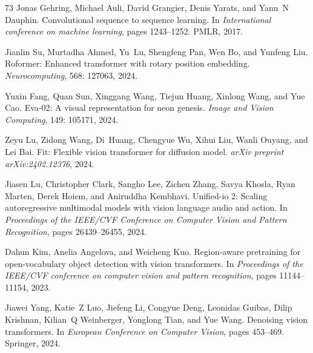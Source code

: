 \documentclass{article}
\begin{document}
\begin{thebibliography}{73}
Jonas Gehring, Michael Auli, David Grangier, Denis Yarats, and Yann~N Dauphin.
\newblock Convolutional sequence to sequence learning.
\newblock In \emph{International conference on machine learning}, pages
  1243--1252. PMLR, 2017.

Jianlin Su, Murtadha Ahmed, Yu~Lu, Shengfeng Pan, Wen Bo, and Yunfeng Liu.
\newblock Roformer: Enhanced transformer with rotary position embedding.
\newblock \emph{Neurocomputing}, 568: 127063, 2024.

Yuxin Fang, Quan Sun, Xinggang Wang, Tiejun Huang, Xinlong Wang, and Yue Cao.
\newblock Eva-02: A visual representation for neon genesis.
\newblock \emph{Image and Vision Computing}, 149: 105171, 2024.

Zeyu Lu, Zidong Wang, Di~Huang, Chengyue Wu, Xihui Liu, Wanli Ouyang, and Lei
  Bai.
\newblock Fit: Flexible vision transformer for diffusion model.
\newblock \emph{arXiv preprint arXiv:2402.12376}, 2024{}.

Jiasen Lu, Christopher Clark, Sangho Lee, Zichen Zhang, Savya Khosla, Ryan
  Marten, Derek Hoiem, and Aniruddha Kembhavi.
\newblock Unified-io 2: Scaling autoregressive multimodal models with vision
  language audio and action.
\newblock In \emph{Proceedings of the IEEE/CVF Conference on Computer Vision
  and Pattern Recognition}, pages 26439--26455, 2024{}.

Dahun Kim, Anelia Angelova, and Weicheng Kuo.
\newblock Region-aware pretraining for open-vocabulary object detection with
  vision transformers.
\newblock In \emph{Proceedings of the IEEE/CVF conference on computer vision
  and pattern recognition}, pages 11144--11154, 2023.

Jiawei Yang, Katie~Z Luo, Jiefeng Li, Congyue Deng, Leonidas Guibas, Dilip
  Krishnan, Kilian~Q Weinberger, Yonglong Tian, and Yue Wang.
\newblock Denoising vision transformers.
\newblock In \emph{European Conference on Computer Vision}, pages 453--469.
  Springer, 2024.


\end{thebibliography}
\end{document}
